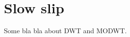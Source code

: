 \documentclass[main.tex]{subfiles}
\begin{document}
\section{Slow slip}

Some bla bla about DWT and MODWT.
\end{document}
